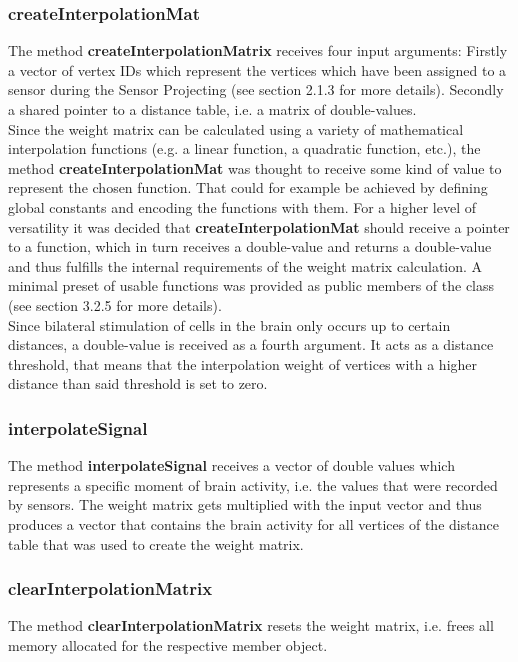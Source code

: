 \subsubsection{createInterpolationMat}
The method \textbf{createInterpolationMatrix} receives four input arguments: Firstly a vector of vertex IDs which represent the vertices which have been assigned to a sensor during the Sensor Projecting (see section 2.1.3 for more details). Secondly a shared pointer to a distance table, i.e. a matrix of double-values.\\
Since the weight matrix can be calculated using a variety of mathematical interpolation functions (e.g. a linear function, a quadratic function, etc.), the method \textbf{createInterpolationMat} was thought to receive some kind of value to represent the chosen function. That could for example be achieved by defining global constants and encoding the functions with them. For a higher level of versatility it was decided that \textbf{createInterpolationMat} should receive a pointer to a function, which in turn receives a double-value and returns a double-value and thus fulfills the internal requirements of the weight matrix calculation. A minimal preset of usable functions was provided as public members of the class (see section 3.2.5 for more details).\\
Since bilateral stimulation of cells in the brain only occurs up to certain distances, a double-value is received as a fourth argument. It acts as a distance threshold, that means that the interpolation weight of vertices with a higher distance than said threshold is set to zero. 

\subsubsection{interpolateSignal}
The method \textbf{interpolateSignal} receives a vector of double values which represents a specific moment of brain activity, i.e. the values that were recorded by sensors. The weight matrix gets multiplied with the input vector and thus produces a vector that contains the brain activity for all vertices of the distance table that was used to create the weight matrix.

\subsubsection{clearInterpolationMatrix}
The method \textbf{clearInterpolationMatrix} resets the weight matrix, i.e. frees all memory allocated for the respective member object.
\\\\

